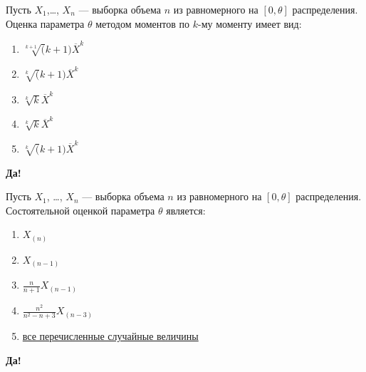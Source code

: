 \documentclass[t]{beamer}
\begin{document}
 \begin{frame} \label{3-Yes} 
\begin{block}{3} 

Пусть $X_1$,\ldots, $X_n$ — выборка объема $n$ из равномерного на $[0, \theta]$ распределения. Оценка параметра $\theta$ методом моментов по $k$-му моменту имеет вид:
 


 \end{block} 
\begin{enumerate} 
\item[] \hyperlink{3-No}{\beamergotobutton{} $\sqrt[k+1](k+1) \overline X^k$}
\item[] \hyperlink{3-Yes}{\beamergotobutton{} $\sqrt[k](k+1) \overline X^k$}
\item[] \hyperlink{3-No}{\beamergotobutton{} $\sqrt[k]k \overline X^k$}
\item[] \hyperlink{3-No}{\beamergotobutton{} $\sqrt[k]k \overline X^k$}
\item[] \hyperlink{3-No}{\beamergotobutton{} $\sqrt[k](k+1) \overline X^k$}
\end{enumerate} 

 \textbf{Да!} 
 \hyperlink{4}{}\end{frame} 


 \begin{frame} \label{4-Yes} 
\begin{block}{4} 

Пусть $X_1$, \ldots, $X_n$ — выборка объема $n$ из равномерного на $[0, \theta]$ распределения. Состоятельной оценкой параметра $\theta$ является:
 


 \end{block} 
\begin{enumerate} 
\item[] \hyperlink{4-No}{\beamergotobutton{} $X_{(n)}$}
\item[] \hyperlink{4-No}{\beamergotobutton{} $X_{(n-1)}$}
\item[] \hyperlink{4-No}{\beamergotobutton{} $\frac{n}{n+1} X_{(n-1)}$}
\item[] \hyperlink{4-No}{\beamergotobutton{} $\frac{n^2}{n^2-n+3} X_{(n-3)}$}
\item[] \hyperlink{4-Yes}{\beamergotobutton{} все перечисленные случайные величины}
\end{enumerate} 

 \textbf{Да!} 
 \hyperlink{5}{}\end{frame} 
\end{document}
